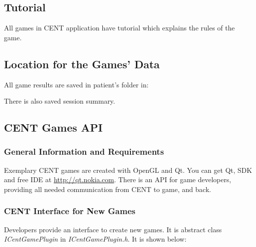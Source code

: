 \documentclass[letterpaper,10pt,english]{sphinxmanual}
\begin{document}
\subsection{\textbf{Tutorial}}
\label{index:tutorial}
All games in CENT application have tutorial which explains the rules of the game.


\subsection{\textbf{Location for the Games' Data}}
\label{index:location-for-the-games-data}
All game results are saved in patient's folder in:
\begin{quote}

\end{quote}

There is also saved session summary.


\subsection{\textbf{CENT Games API}}
\label{index:cent-games-api}

\subsubsection{General Information and Requirements}
\label{index:general-information-and-requirements}
Exemplary CENT games are created with OpenGL and Qt. You can get Qt, SDK and free IDE at \href{http://qt.nokia.com}{http://qt.nokia.com}.
There is an API for game developers, providing all needed communication from CENT to game, and back.


\subsubsection{CENT Interface for New Games}
\label{index:cent-interface-for-new-games}
Developers provide an interface to create new games. It is abstract class \emph{ICentGamePlugin} in \emph{ICentGamePlugin.h}. It is shown below:
\end{document}
